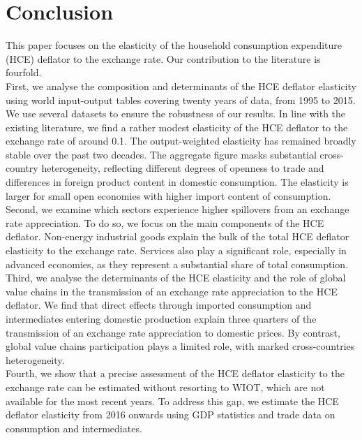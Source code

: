 \documentclass[12pt,a4paper]{paper}
\begin{document}
\section{Conclusion}
\label{sec:ccl}
This paper focuses on the elasticity of the household consumption expenditure (HCE) deflator to the exchange rate.
Our contribution to the literature is fourfold. \\
First, we analyse the composition and determinants of the HCE deflator elasticity using world input-output tables covering twenty years of data, from 1995 to 2015. 
We use several datasets to ensure the robustness of our results.
In line with the existing literature, we find a rather modest elasticity of the HCE deflator to the exchange rate of around 0.1.
The output-weighted elasticity has remained broadly stable over the past two decades.
The aggregate figure masks substantial cross-country heterogeneity, reflecting different degrees of openness to trade and differences in foreign product content in domestic consumption. 
The elasticity is larger for small open economies with higher import content of consumption. \\
Second, we examine which sectors experience higher spillovers from an exchange rate appreciation. 
To do so, we focus on the main components of the HCE deflator. 
Non-energy industrial goods explain the bulk of the total HCE deflator elasticity to the exchange rate. 
Services also play a significant role, especially in advanced economies, as they represent a substantial share of total consumption. \\
Third, we analyse the determinants of the HCE elasticity and the role of global value chains in the transmission of an exchange rate appreciation to the HCE deflator.
We find that direct effects through imported consumption and intermediates entering domestic production explain three quarters of the transmission of an exchange rate appreciation to domestic prices.
By contrast, global value chains participation plays a limited role, with marked cross-countries heterogeneity.\\
Fourth, we show that a precise assessment of the HCE deflator elasticity to the exchange rate can be estimated without resorting to WIOT, which are not available for the most recent years. 
To address this gap, we estimate the HCE deflator elasticity from 2016 onwards using GDP statistics and trade data on consumption and intermediates.
\end{document}
